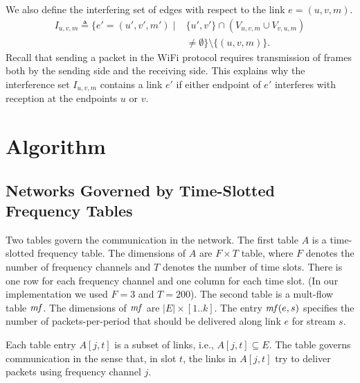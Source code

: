 \documentclass[12pt]{article}
\newtheorem{claim}[theorem]{Claim}
\newenvironment{proof sketch}[1]{\noindent {\emph{Proof sketch of #1:}}}{\hfill \qed}
\newcommand{\eqdf}{\triangleq}
\newcommand{\SINR}{\text{\sc{sinr}}}
\newcommand{\mf}{\text{\emph{mf}}}
\begin{document}
We also define the interfering set of edges with respect to the link $e=(u,v,m)$.
\begin{align*}
  I_{u,v,m} \eqdf \{ e'=(u',v',m') \mid &\{u',v'\} \cap (V_{u,v,m} \cup V_{v,u,m})
\\
& \neq \emptyset\} \setminus \{(u,v,m)\}.
\end{align*}
Recall that sending a packet in the WiFi protocol requires
transmission of frames both by the sending side and the receiving
side.  This explains why the interference set $I_{u,v,m}$ contains a
link $e'$ if either endpoint of $e'$ interferes with reception at the
endpoints $u$ or $v$.

\section{Algorithm}\label{sec:outline}
\subsection{Networks Governed by Time-Slotted Frequency Tables}
Two tables govern the communication in the network.  The first table
$A$ is a time-slotted frequency table. The dimensions of $A$ are
$F\times T$ table, where $F$ denotes the number of frequency channels
and $T$ denotes the number of time slots.  There is one row for each
frequency channel and one column for each time slot. (In our
implementation we used $F=3$ and $T=200$).  The second table is a
mult-flow table $\mf$. The dimensions of $\mf$ are $|E|\times [1..k]$.
The entry $\mf(e,s)$ specifies the number of packets-per-period that
should be delivered along link $e$ for stream $s$.

Each table entry $A[j,t]$ is a subset of links,
i.e., $A[j,t]\subseteq E$.  The table governs communication in the
sense that, in slot $t$, the links in $A[j,t]$ try to deliver packets
using frequency channel $j$.
\end{document}

